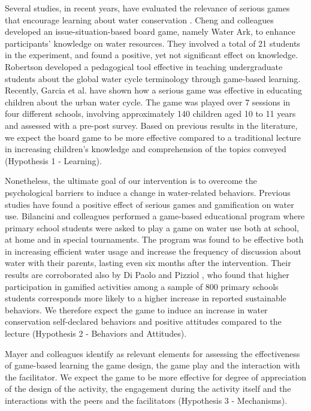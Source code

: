 \documentclass[preprint,12pt]{elsarticle}
\begin{document}
Several studies, in recent years, have evaluated the relevance of serious games that encourage learning about water conservation \cite{medema2019potential}. Cheng and colleagues \cite{cheng2019development} developed an issue-situation-based board game, namely Water Ark, to enhance participants’ knowledge on water resources. They involved a total of 21 students in the experiment, and found a positive, yet not significant effect on knowledge. Robertson \cite{robertson2022increasing} developed a pedagogical tool effective in teaching undergraduate students about the global water cycle terminology through game-based learning. Recently, Garcia et al. \cite{garcia2025evaluating} have shown how a serious game was effective in educating children about the urban water cycle. The game was played over 7 sessions in four different schools, involving approximately 140 children aged 10 to 11 years and assessed with a pre-post survey. Based on previous results in the literature, we expect the board game to be more effective compared to a traditional lecture in increasing children's knowledge and comprehension \cite{bloom1956taxonomy} of the topics conveyed (Hypothesis 1 - Learning).  

Nonetheless, the ultimate goal of our intervention is to overcome the psychological barriers to induce a change in water-related behaviors. Previous studies have found a positive effect of serious games and gamification on water use. Bilancini and colleagues \cite{bilancini2023game} performed a game-based educational program where primary school students were asked to play a game on water use both at school, at home and in special tournaments. The program was found to be effective both in increasing efficient water usage and increase the frequency of discussion about water with their parents, lasting even six months after the intervention. Their results are corroborated also by Di Paolo and Pizziol \cite{di2024gamification}, who found that higher participation in gamified activities among a sample of 800 primary schools students corresponds more likely to a higher increase in reported sustainable behaviors. We therefore expect the game to induce an increase in water conservation self-declared behaviors and positive attitudes compared to the lecture (Hypothesis 2 - Behaviors and Attitudes).

Mayer and colleagues \cite{mayer2012towards} identify as relevant elements for assessing the effectiveness of game-based learning the game design, the game play and the interaction with the facilitator. We expect the game to be more effective for degree of appreciation of the design of the activity, the engagement during the activity itself and the interactions with the peers and the facilitators (Hypothesis 3 - Mechanisms).
\end{document}

